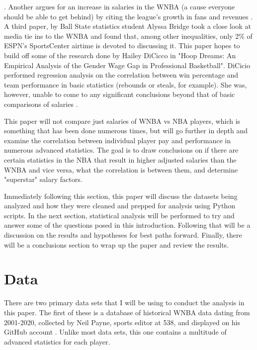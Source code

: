 \documentclass[12pt]{article}
\begin{document}
\citep{baker2020comparison}. Another argues for an increase in salaries in the WNBA (a cause everyone
should be able to get behind) by citing the league's growth in fans and revenues \citep{ettienne2019s}. A third paper, by Ball State statistics student 
Alyssa Bridge took a close look at media tie ins to the WNBA and found that, among other inequalities, only 2\% of ESPN’s SportsCenter airtime is devoted 
to discussing it. \citep{Bridge}
This paper hopes to build off some of the research done by Hailey DiCicco in "Hoop Dreams: An Empirical Analysis of the Gender Wage Gap in Professional 
Basketball". DiCicio performed regression analysis on the correlation between win percentage and team performance in basic statistics (rebounds or steals, 
for example). She was, however, unable to come to any significant conclusions beyond that of basic comparisons of salaries \citep{Hoop_Dreams}.
\par
This paper will not compare just salaries of WNBA vs NBA players, which is something that has been done numerous times, but will go further in depth and 
examine the correlation between individual player pay and performance in numerous advanced statistics. The goal is to draw conclusions on if there 
are certain statistics in the NBA that result in higher adjusted salaries than the WNBA and vice versa, what the correlation is between them, and 
determine "superstar" salary factors.
\par
Immediately following this section, this paper will discuss the datasets being analyzed and how they were cleaned and prepped for analysis using Python 
scripts. In the next section, statistical analysis will be performed to try and answer some of the questions posed in this introduction. Following that 
will be a discussion on the results and hypotheses for best paths forward. Finally, there will be a conclusions section to wrap up the paper and review 
the results.


\section{Data}
\hspace*{10mm}
There are two primary data sets that I will be using to conduct the analysis in this paper. The first of these is a database of historical WNBA data 
dating from 2001-2020, collected by Neil Payne, sports editor at 538, and displayed on his GitHub account \citep{first}. Unlike most data sets, this one 
contains a multitude of advanced statistics for each player.
\end{document}
